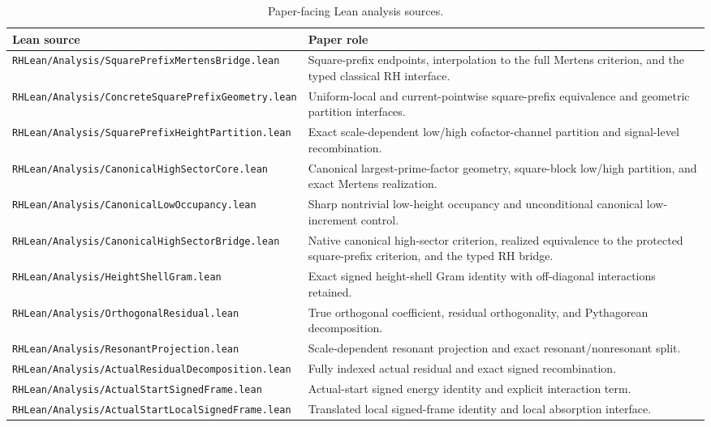 
\begin{table}[htbp]
\centering
\caption{Paper-facing Lean analysis sources.}
\label{tab:lean-analysis-sources}
\small
\renewcommand{\arraystretch}{1.18}
\begin{tabular}{p{}p{}}
\toprule
Lean source & Paper role\\
\midrule
\texttt{RHLean/Analysis/SquarePrefixMertensBridge.lean}
& Square-prefix endpoints, interpolation to the full Mertens criterion, and the typed classical RH interface.\\
\texttt{RHLean/Analysis/ConcreteSquarePrefixGeometry.lean}
& Uniform-local and current-pointwise square-prefix equivalence and geometric partition interfaces.\\
\texttt{RHLean/Analysis/SquarePrefixHeightPartition.lean}
& Exact scale-dependent low/high cofactor-channel partition and signal-level recombination.\\
\texttt{RHLean/Analysis/CanonicalHighSectorCore.lean}
& Canonical largest-prime-factor geometry, square-block low/high partition, and exact Mertens realization.\\
\texttt{RHLean/Analysis/CanonicalLowOccupancy.lean}
& Sharp nontrivial low-height occupancy and unconditional canonical low-increment control.\\
\texttt{RHLean/Analysis/CanonicalHighSectorBridge.lean}
& Native canonical high-sector criterion, realized equivalence to the protected square-prefix criterion, and the typed RH bridge.\\
\texttt{RHLean/Analysis/HeightShellGram.lean}
& Exact signed height-shell Gram identity with off-diagonal interactions retained.\\
\texttt{RHLean/Analysis/OrthogonalResidual.lean}
& True orthogonal coefficient, residual orthogonality, and Pythagorean decomposition.\\
\texttt{RHLean/Analysis/ResonantProjection.lean}
& Scale-dependent resonant projection and exact resonant/nonresonant split.\\
\texttt{RHLean/Analysis/ActualResidualDecomposition.lean}
& Fully indexed actual residual and exact signed recombination.\\
\texttt{RHLean/Analysis/ActualStartSignedFrame.lean}
& Actual-start signed energy identity and explicit interaction term.\\
\texttt{RHLean/Analysis/ActualStartLocalSignedFrame.lean}
& Translated local signed-frame identity and local absorption interface.\\
\bottomrule
\end{tabular}
\end{table}
